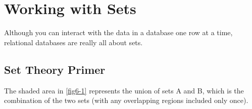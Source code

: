 \chapter{Working with Sets\label{Ch06}}
Although you can interact with the data in a database one row at a time, relational databases are really all about sets.
\section{Set Theory Primer}
The shaded area in \autoref{fig6-1} represents the union of sets A and B, which is the combination of the two sets (with any overlapping regions included only once).
